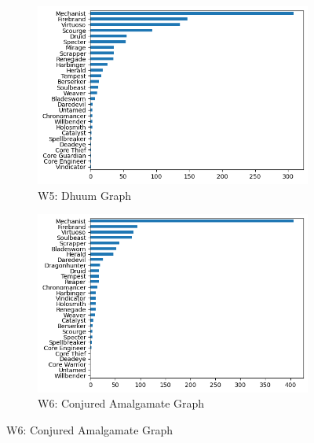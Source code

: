 \documentclass[12pt,a4paper]{article}
\begin{document}
\begin{figure}[h!]
        \begin{subfigure}{0.5\textwidth}
            \centering
            \includegraphics[scale=0.4]{dhuum_graph.png}
            \caption{\small W5: Dhuum Graph}
        \end{subfigure}%
        \begin{subfigure}{0.5\textwidth}
            \centering
            \includegraphics[scale=0.4]{ca_graph.png}
            \caption{\small W6: Conjured Amalgamate Graph}
        \end{subfigure}


\end{figure}
\end{document}
